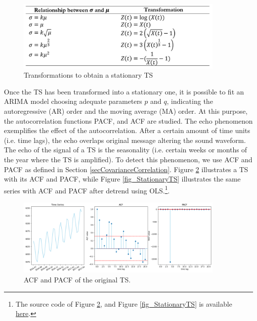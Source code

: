 \begin{figure}[hbt!]
\centering
\includegraphics[width=0.9\textwidth]{SectionLetsMath/elemStat_figures/tab_transformation.png}
\captionsetup{type=table}
\caption{Transformations to obtain a stationary TS}
\label{tab_transformation}
\end{figure}


Once the TS has been transformed into a stationary one, it is possible to fit an ARIMA model choosing adequate parameters $p$ and $q$, indicating the autoregressive (AR) order and the moving average (MA) order. At this purpose, the autocorrelation functions PACF, and ACF are studied. The echo phenomenon exemplifies the effect of the autocorrelation. After a certain amount of time units (i.e. time lags), the echo overlaps original message altering the sound waveform. The echo of the signal of a TS is the seasonality (i.e. certain weeks or months of the year where the TS is amplified). To detect this phenomenon, we use ACF and PACF as defined in Section \ref{secCovarianceCorrelation}. Figure \ref{fig_nonStationaryTS} illustrates a TS with its ACF and PACF, while Figure \ref{fig_StationaryTS} illustrates the same series with ACF and PACF after detrend using OLS.\footnote{The source code of Figure \ref{fig_nonStationaryTS}, and Figure \ref{fig_StationaryTS} is available \href{https://github.com/aletuf93/logproj/blob/master/examples/03.\%20Statistics.ipynb}{here}.}.


\begin{figure}[hbt!]
\centering
\includegraphics[width=0.9\textwidth]{SectionLetsMath/elemStat_figures/fig_nonStationaryTS.png}
\captionsetup{type=figure}
\caption{ACF and PACF of the original TS.}
\label{fig_nonStationaryTS}
\end{figure}

